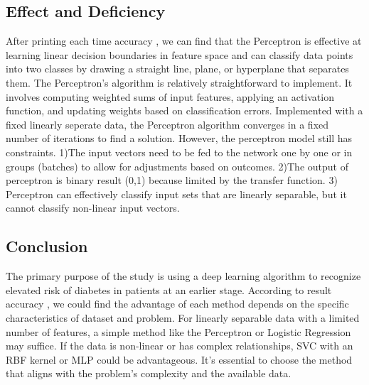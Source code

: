 \documentclass[10pt,twocolumn,letterpaper]{article}
\begin{document}
\subsection{Effect and Deficiency}
After printing each time accuracy , we can find that the Perceptron is effective at learning linear decision boundaries in feature space and can classify data points into two classes by drawing a straight line, plane, or hyperplane that separates them. The Perceptron's algorithm is relatively straightforward to implement. It involves computing weighted sums of input features, applying an activation function, and updating weights based on classification errors. Implemented with a fixed linearly seperate data, the Perceptron algorithm converges in a fixed number of iterations to find a solution. However, the perceptron model still has constraints. 1)The input vectors need to be fed to the network one by one or in groups (batches) to allow for adjustments based on outcomes. 2)The output of perceptron is binary result (0,1)  because limited by the transfer function. 3) Perceptron can effectively classify input sets that are linearly separable, but it cannot classify non-linear input vectors.\cite{hu2008classification}


\subsection{Conclusion}

The primary purpose of the study is using a deep learning algorithm to recognize elevated risk of diabetes in patients at an earlier stage. According to result accuracy , we could find the advantage of each method depends on the specific characteristics of dataset and problem. For linearly separable data with a limited number of features, a simple method like the Perceptron or Logistic Regression may suffice. If the data is non-linear or has complex relationships, SVC with an RBF kernel or MLP could be advantageous. It's essential to choose the method that aligns with the problem's complexity and the available data. 








{\small


}
\end{document}
